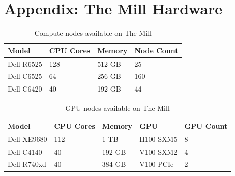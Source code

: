 \documentclass[11pt,a4paper]{article}
\begin{document}
\section*{Appendix: The Mill Hardware}
\begin{table}[h]
\centering
\begin{tabular}{@{}llll@{}}
\toprule
\textbf{Model} & \textbf{CPU Cores} & \textbf{Memory} & \textbf{Node Count} \\
\midrule
Dell R6525 & 128 & 512 GB & 25 \\
Dell C6525 & 64 & 256 GB & 160 \\
Dell C6420 & 40 & 192 GB & 44 \\
\bottomrule
\end{tabular}
\caption{Compute nodes available on The Mill}
\end{table}
\begin{table}[h]
\centering
\begin{tabular}{@{}lllll@{}}
\toprule
\textbf{Model} & \textbf{CPU Cores} & \textbf{Memory} & \textbf{GPU} & \textbf{GPU Count} \\
\midrule
Dell XE9680 & 112 & 1 TB & H100 SXM5 & 8 \\
Dell C4140 & 40 & 192 GB & V100 SXM2 & 4 \\
Dell R740xd & 40 & 384 GB & V100 PCIe & 2 \\
\bottomrule
\end{tabular}
\caption{GPU nodes available on The Mill}
\end{table}
\end{document}

